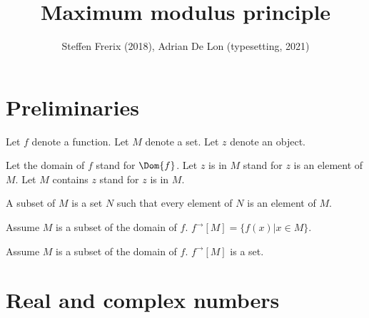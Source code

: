 \documentclass{article}
\title{Maximum modulus principle}
\author{Steffen Frerix (2018), Adrian De Lon (typesetting, 2021)}
\date{}
\newcommand{\image}[2]{#1^{\to}[#2]}
\begin{document}

  \maketitle


  \section{Preliminaries}

  \begin{forthel}

    Let $f$ denote a function.
    Let $M$ denote a set.
    Let $z$ denote an object.

    Let the domain of $f$ stand for $\Dom{f}$.
    Let $z$ is in $M$ stand for $z$ is an element of $M$.
    Let $M$ contains $z$ stand for $z$ is in $M$.

    \begin{definition}
      A subset of $M$ is a set $N$ such that
      every element of $N$ is an element of $M$.
    \end{definition}

    \begin{definition}
      Assume $M$ is a subset of the domain of $f$.
      $\image{f}{M} = \{ f(x) | x\in M \}$.
    \end{definition}

    \begin{axiom}
      Assume $M$ is a subset of the domain of $f$.
      $\image{f}{M}$ is a set.
    \end{axiom}
  \end{forthel}

    \section{Real and complex numbers}
\end{document}
